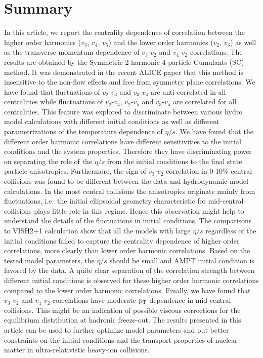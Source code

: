 \section{Summary}
\label{sec:summary}
In this article, we report the centrality dependence of correlation between the higher order harmonics ($v_3$, $v_4$, $v_5$) and the lower order harmonics ($v_2$, $v_3$) as well as the transverse momentum dependence of $v_3$-$v_2$ and $v_4$-$v_2$ correlations.
The results are obtained by the Symmetric 2-harmonic 4-particle Cumulants (SC) method. It was demonstrated in the recent ALICE paper that this method is insensitive to the non-flow effects and free from symmetry plane correlations.
We have found that fluctuations of $v_2$-$v_3$ and $v_3$-$v_4$ are anti-correlated in all centralities while fluctuations of $v_2$-$v_4$, $v_2$-$v_5$ and $v_3$-$v_5$ are correlated for all centralities. 
This feature was explored to discriminate between various hydro model calculations with different initial conditions as well as different parametrizations of the temperature dependence of $\eta/s$.
We have found that the different order harmonic correlations have different sensitivities to the initial conditions and the system properties. Therefore they have discriminating power on separating the role of the $\eta/s$  from the initial conditions to the final state particle anisotropies.
Furthermore, the sign of $v_3$-$v_2$ correlation in 0-10\% central collisions was found to be different between the data and hydrodynamic model calculations.
In the most central collisions the anisotropies originate mainly from fluctuations, i.e.\ the initial ellipsoidal geometry characteristic for mid-central collisions plays little role in this regime. Hence this observation might help to understand the details of the fluctuations in initial conditions. 
The comparisons to VISH2+1 calculation show that all the models with large $\eta/s$ regardless of the initial conditions failed to capture the centrality dependence of higher order correlations, more clearly than lower order harmonic correlations. 
Based on the tested model parameters, the $\eta/s$ should be small and AMPT initial condition is favored by the data. A quite clear separation of the correlation strength between different initial conditions is observed for these higher order harmonic correlations compared to the lower order harmonic correlations.
Finally, we have found that $v_3$-$v_2$ and $v_4$-$v_2$ correlations have moderate $p_{\rm T}$ dependence in mid-central collisions. This might be an indication of possible viscous corrections for the equilibrium distribution at hadronic freeze-out.
The results presented in this article can be used to further optimize model parameters and put better constraints on the initial conditions and the transport properties of nuclear matter in ultra-relativistic heavy-ion collisions.
